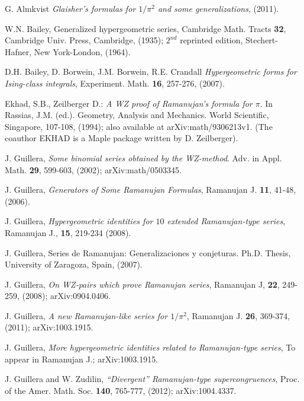 \documentclass[12pt,a4paper]{amsart}
\begin{document}
\begin{thebibliography}{99}

 G. Almkvist {\it Glaisher's formulas for $1/\pi^2$ and some generalizations}, (2011).

 W.N. Bailey, Generalized hypergeometric series, Cambridge Math. Tracts  \textbf{32},
Cambridge Univ. Press, Cambridge, (1935); $2^{nd}$ reprinted edition, Stechert-Hafner, New York-London, (1964).

 D.H. Bailey, D. Borwein, J.M. Borwein, R.E. Crandall {\it Hypergeometric forms for
Ising-class integrals}, Experiment. Math. \textbf{16}, 257-276, (2007).

 Ekhad, S.B., Zeilberger D.: { \it A WZ proof of Ramanujan's formula for $\pi$}. In Rassias, J.M. (ed.).
Geometry, Analysis and Mechanics. World Scientific, Singapore, 107-108, (1994); also available at arXiv:math/9306213v1. (The coauthor EKHAD is a Maple package written by D. Zeilberger).

 J. Guillera, {\it Some binomial series obtained by the WZ-method}.
Adv. in Appl. Math. \textbf{29}, 599-603, (2002); arXiv:math/0503345.

 J. Guillera, {\it Generators of Some Ramanujan Formulas},
Ramanujan J. \textbf{11}, 41-48, (2006).

 J. Guillera, {\it Hypergeometric identities for $10$ extended Ramanujan-type series},
Ramanujan J., \textbf{15}, 219-234 (2008).

 J. Guillera, Series de Ramanujan: Generalizaciones y conjeturas. Ph.D. Thesis,
University of Zaragoza, Spain, (2007).

 J. Guillera, {\it On WZ-pairs which prove Ramanujan series}, Ramanujan J,
\textbf{22}, 249-259, (2008); arXiv:0904.0406.

 J. Guillera, {\it A new Ramanujan-like series for $1/\pi^2$}, Ramanujan J.
\textbf{26}, 369-374, (2011); arXiv:1003.1915.

 J. Guillera, {\it More hypergeometric identities related to Ramanujan-type series}, To appear in Ramanujan J.;
arXiv:1003.1915.

 J. Guillera and W. Zudilin, {\it ``Divergent'' Ramanujan-type supercongruences}, Proc. of the Amer. Math. Soc.
\textbf{140}, 765-777, (2012); arXiv:1004.4337.


\end{thebibliography}
\end{document}
